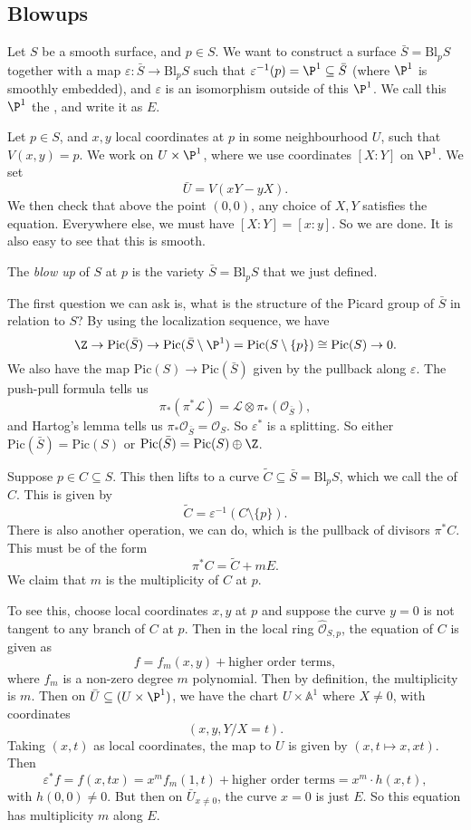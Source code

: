 \documentclass[a4paper]{article}
\newcommand\A{\mathbb{A}}
\newcommand\Pic{\mathrm{Pic}}
\newcommand\Bl{\mathrm{Bl}}
\begin{document}
\subsection{Blowups}
Let $S$ be a smooth surface, and $p \in S$. We want to construct a surface $\bar{S} = \Bl_p S$ together with a map $\varepsilon: \bar{S} \to \Bl_p S$ such that $\varepsilon^{-1}(p) = \P^1 \subseteq \bar{S}$ (where $\P^1$ is smoothly embedded), and $\varepsilon$ is an isomorphism outside of this $\P^1$. We call this $\P^1$ the , and write it as $E$.

Let $p \in S$, and $x, y$ local coordinates at $p$ in some neighbourhood $U$, such that $V(x, y) = p$. We work on $U \times \P^1$, where we use coordinates $[X: Y]$ on $\P^1$. We set
\[
  \bar{U} = V(xY - yX).
\]
We then check that above the point $(0, 0)$, any choice of $X, Y$ satisfies the equation. Everywhere else, we must have $[X:Y] = [x:y]$. So we are done. It is also easy to see that this is smooth.

\begin{defi}[Blow-up]
  The \emph{blow up} of $S$ at $p$ is the variety $\bar{S} = \Bl_p S$ that we just defined.
\end{defi}

The first question we can ask is, what is the structure of the Picard group of $\bar{S}$ in relation to $S$? By using the localization sequence, we have
\[
  \Z \to \Pic(\bar{S}) \to \Pic(\bar{S} \setminus \P^1) = \Pic(S \setminus \{p\}) \cong \Pic(S) \to 0.
\]
We also have the map $\Pic(S) \to \Pic(\bar{S})$ given by the pullback along $\varepsilon$. The push-pull formula tells us
\[
  \pi_* (\pi^* \mathcal{L}) = \mathcal{L} \otimes \pi_*(\mathcal{O}_{\bar{S}}),
\]
and Hartog's lemma tells us $\pi_* \mathcal{O}_{\bar{S}} = \mathcal{O}_S$. So $\varepsilon^*$ is a splitting. So either $\Pic(\bar{S}) = \Pic(S)$ or $\Pic(\bar{S}) = \Pic(S) \oplus \Z$.

Suppose $p \in C \subseteq S$. This then lifts to a curve $\tilde{C} \subseteq \bar{S} = \Bl_p S$, which we call the  of $C$. This is given by
\[
  \tilde{C} = \varepsilon^{-1}(C \setminus \{p\}).
\]
There is also another operation, we can do, which is the pullback of divisors $\pi^* C$. This must be of the form
\[
  \pi^* C = \tilde{C} + mE.
\]
We claim that $m$ is the multiplicity of $C$ at $p$.

To see this, choose local coordinates $x, y$ at $p$ and suppose the curve $y = 0$ is not tangent to any branch of $C$ at $p$. Then in the local ring $\hat{\mathcal{O}}_{S, p}$, the equation of $C$ is given as
\[
  f = f_m(x, y) + \text{higher order terms},
\]
where $f_m$ is a non-zero degree $m$ polynomial. Then by definition, the multiplicity is $m$. Then on $\bar{U} \subseteq (U \times \P^1)$, we have the chart $U \times \A^1$ where $X \not= 0$, with coordinates
\[
  (x, y, Y/X = t).
\]
Taking $(x, t)$ as local coordinates, the map to $U$ is given by $(x, t \mapsto x, xt)$. Then
\[
  \varepsilon^* f = f(x, tx) = x^m f_m(1, t) + \text{higher order terms} = x^m \cdot h(x, t),
\]
with $h(0, 0) \not= 0$. But then on $\bar{U}_{x \not= 0}$, the curve $x = 0$ is just $E$. So this equation has multiplicity $m$ along $E$.
\end{document}
